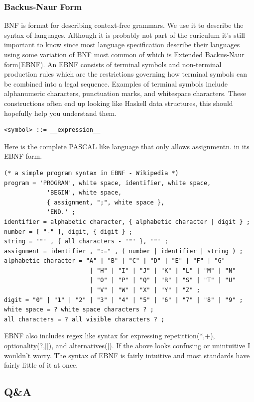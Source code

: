 \documentclass{article}
\begin{document}
        \subsubsection{Backus-Naur Form}
            \gls{BNF} is format for describing context-free grammars. We use it to describe the syntax of languages. Although it is probably not part of the curiculum
            it's still important to know since most language specification describe their languages using some variation of BNF most common of which is Extended Backus-Naur form(EBNF).
            An EBNF consists of terminal symbols and non-terminal production rules which are the restrictions governing how terminal symbols can be combined into a legal sequence. 
            Examples of terminal symbols include alphanumeric characters, punctuation marks, and whitespace characters. These constructions often end up looking like Haskell data structures,
            this should hopefully help you understand them.
            \begin{lstlisting}
<symbol> ::= __expression__
            \end{lstlisting}
            Here is the complete PASCAL like language that only allows assignmentn. in its EBNF form.
            \begin{lstlisting}
(* a simple program syntax in EBNF - Wikipedia *)
program = 'PROGRAM', white space, identifier, white space, 
            'BEGIN', white space, 
            { assignment, ";", white space }, 
            'END.' ;
identifier = alphabetic character, { alphabetic character | digit } ;
number = [ "-" ], digit, { digit } ;
string = '"' , { all characters - '"' }, '"' ;
assignment = identifier , ":=" , ( number | identifier | string ) ;
alphabetic character = "A" | "B" | "C" | "D" | "E" | "F" | "G"
                        | "H" | "I" | "J" | "K" | "L" | "M" | "N"
                        | "O" | "P" | "Q" | "R" | "S" | "T" | "U"
                        | "V" | "W" | "X" | "Y" | "Z" ;
digit = "0" | "1" | "2" | "3" | "4" | "5" | "6" | "7" | "8" | "9" ;
white space = ? white space characters ? ;
all characters = ? all visible characters ? ;
            \end{lstlisting}
            EBNF also includes regex like syntax for expressing repetittion(*,+), optionality(?,[]), and alternatives(|).
            If the above looks confusing or unintuitive I wouldn't worry. The syntax of EBNF is fairly intuitive and most standards have fairly little of it at once.
        \subsection{Q\&A}
\end{document}
